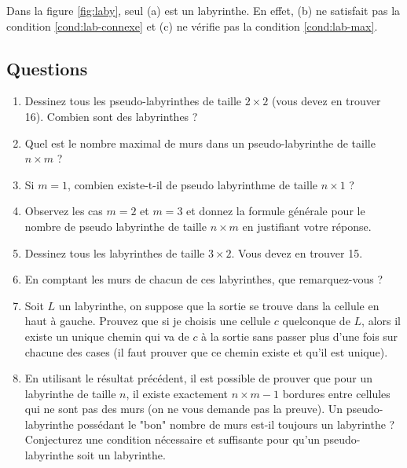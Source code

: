 \documentclass{../ficheTDTP}
\begin{document}
Dans la figure \ref{fig:laby}, seul (a) est un labyrinthe. En effet, (b) ne satisfait pas la condition \eqref{cond:lab-connexe} et (c) ne vérifie pas la condition \eqref{cond:lab-max}.


\subsection{Questions}

\begin{enumerate}

\item Dessinez tous les pseudo-labyrinthes de taille $2 \times 2$ (vous devez en trouver 16). Combien sont des labyrinthes ? 

\item Quel est le nombre maximal de murs dans un pseudo-labyrinthe de taille $n \times m$ ?

\item Si $m=1$, combien existe-t-il de pseudo labyrinthme de taille $n \times 1$ ?

\item Observez les cas $m=2$ et $m=3$ et donnez la formule générale pour le nombre de pseudo labyrinthe de taille $n \times m$ en justifiant votre réponse.

\item Dessinez tous les labyrinthes de taille $3 \times 2$. Vous devez en trouver 15. 

\item En comptant les murs de chacun de ces labyrinthes, que remarquez-vous ? 

\item Soit $L$ un labyrinthe, on suppose que la sortie se trouve dans la cellule en haut à gauche. Prouvez que si je choisis une cellule $c$ quelconque de $L$, alors il existe un unique chemin qui va de $c$ à la sortie sans passer plus d'une fois sur chacune des cases (il faut prouver que ce chemin existe et qu'il est unique). 


\item En utilisant le résultat précédent, il est possible de prouver que pour un labyrinthe de taille $n$, il existe exactement $n \times m - 1$ bordures entre cellules qui ne sont pas des murs (on ne vous demande pas la preuve). Un pseudo-labyrinthe possédant le "bon" nombre de murs est-il toujours un labyrinthe ? Conjecturez une condition nécessaire et suffisante pour qu'un pseudo-labyrinthe soit un labyrinthe. 

\end{enumerate}
\end{document}
